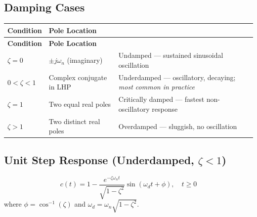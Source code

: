 \documentclass[12pt,a4paper]{article}
\begin{document}
\subsection{Damping Cases}

\begingroup
\setlength{\LTleft}{0pt}
\setlength{\LTright}{0pt}
\begin{longtable}{|>{\centering\arraybackslash}p{2.2cm}|>{\centering\arraybackslash}p{2.4cm}|>{\small\raggedright\arraybackslash}m{\dimexpr(\linewidth-2.2cm-2.4cm-6\tabcolsep-4\arrayrulewidth)/1\relax}|}
\hline
\textbf{\color{myteal}Condition} & \textbf{\color{myteal}Pole Location} & \multicolumn{1}{c|}{\textbf{\color{myteal}Response}} \\
\hline
\endfirsthead
\hline
\textbf{\color{myteal}Condition} & \textbf{\color{myteal}Pole Location} & \multicolumn{1}{c|}{\textbf{\color{myteal}Response}} \\
\hline
\endhead
$\zeta = 0$ & $\pm j\omega_n$ (imaginary) & Undamped — sustained sinusoidal oscillation \\
\hline
$0 < \zeta < 1$ & Complex conjugate in LHP & Underdamped — oscillatory, decaying; \textit{most common in practice} \\
\hline
$\zeta = 1$ & Two equal real poles & Critically damped — fastest non-oscillatory response \\
\hline
$\zeta > 1$ & Two distinct real poles & Overdamped — sluggish, no oscillation \\
\hline
\end{longtable}
\endgroup

\subsection{Unit Step Response (Underdamped, \texorpdfstring{$\zeta < 1$}{zeta < 1})}

\begin{tcolorbox}[formulabox, title={Step Response Formula}]
$$c(t) = 1 - \frac{e^{-\zeta\omega_n t}}{\sqrt{1-\zeta^2}}\sin\!\left(\omega_d t + \phi\right), \quad t \geq 0$$
where $\phi = \cos^{-1}(\zeta)$ and $\omega_d = \omega_n\sqrt{1-\zeta^2}$.
\end{tcolorbox}
\end{document}
